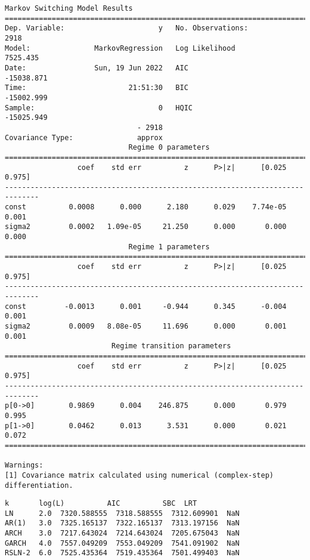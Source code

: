 \documentclass[11pt]{article}
\makeatletter
\newcommand{\boxspacing}{\kern\kvtcb@left@rule\kern\kvtcb@boxsep}
\newcommand{\prompt}[4]{
        {\ttfamily\llap{{\color{#2}[#3]:\hspace{3pt}#4}}\vspace{-\baselineskip}}
    }
\makeatother
\begin{document}
    \begin{Verbatim}[commandchars=\\\{\}]
                        Markov Switching Model Results
==============================================================================
Dep. Variable:                      y   No. Observations:                 2918
Model:               MarkovRegression   Log Likelihood                7525.435
Date:                Sun, 19 Jun 2022   AIC                         -15038.871
Time:                        21:51:30   BIC                         -15002.999
Sample:                             0   HQIC                        -15025.949
                               - 2918
Covariance Type:               approx
                             Regime 0 parameters
==============================================================================
                 coef    std err          z      P>|z|      [0.025      0.975]
------------------------------------------------------------------------------
const          0.0008      0.000      2.180      0.029    7.74e-05       0.001
sigma2         0.0002   1.09e-05     21.250      0.000       0.000       0.000
                             Regime 1 parameters
==============================================================================
                 coef    std err          z      P>|z|      [0.025      0.975]
------------------------------------------------------------------------------
const         -0.0013      0.001     -0.944      0.345      -0.004       0.001
sigma2         0.0009   8.08e-05     11.696      0.000       0.001       0.001
                         Regime transition parameters
==============================================================================
                 coef    std err          z      P>|z|      [0.025      0.975]
------------------------------------------------------------------------------
p[0->0]        0.9869      0.004    246.875      0.000       0.979       0.995
p[1->0]        0.0462      0.013      3.531      0.000       0.021       0.072
==============================================================================

Warnings:
[1] Covariance matrix calculated using numerical (complex-step) differentiation.
    \end{Verbatim}

            \begin{tcolorbox}[breakable, size=fbox, boxrule=.5pt, pad at break*=1mm, opacityfill=0]
\prompt{Out}{outcolor}{6}{\boxspacing}
\begin{Verbatim}[commandchars=\\\{\}]
          k       log(L)          AIC          SBC  LRT
LN      2.0  7320.588555  7318.588555  7312.609901  NaN
AR(1)   3.0  7325.165137  7322.165137  7313.197156  NaN
ARCH    3.0  7217.643024  7214.643024  7205.675043  NaN
GARCH   4.0  7557.049209  7553.049209  7541.091902  NaN
RSLN-2  6.0  7525.435364  7519.435364  7501.499403  NaN
\end{Verbatim}
\end{tcolorbox}
\end{document}
